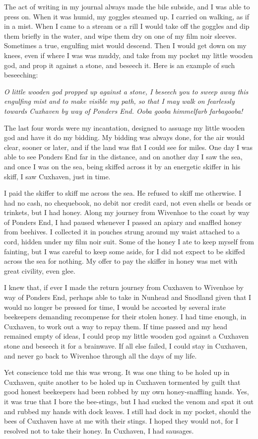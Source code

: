The act of writing in my journal always made the bile subside, and I was able to press on. When it was humid, my goggles steamed up. I carried on walking, as if in a mist. When I came to a stream or a rill I would take off the goggles and dip them briefly in the water, and wipe them dry on one of my film noir sleeves. Sometimes a true, engulfing mist would descend. Then I would get down on my knees, even if where I was was muddy, and take from my pocket my little wooden god, and prop it against a stone, and beseech it. Here is an example of such beseeching:

\emph{O little wooden god propped up against a stone, I beseech you to sweep away this engulfing mist and to make visible my path, so that I may walk on fearlessly towards Cuxhaven by way of Ponders End. Ooba gooba himmelfarb farbagooba!}

The last four words were my incantation, designed to assuage my little wooden god and have it do my bidding. My bidding was always done, for the air would clear, sooner or later, and if the land was flat I could see for miles. One day I was able to see Ponders End far in the distance, and on another day I saw the sea, and once I was on the sea, being skiffed across it by an energetic skiffer in his skiff, I saw Cuxhaven, just in time.

I paid the skiffer to skiff me across the sea. He refused to skiff me otherwise. I had no cash, no chequebook, no debit nor credit card, not even shells or beads or trinkets, but I had honey. Along my journey from Wivenhoe to the coast by way of Ponders End, I had paused whenever I passed an apiary and snaffled honey from beehives. I collected it in pouches strung around my waist attached to a cord, hidden under my film noir suit. Some of the honey I ate to keep myself from fainting, but I was careful to keep some aside, for I did not expect to be skiffed across the sea for nothing. My offer to pay the skiffer in honey was met with great civility, even glee.

I knew that, if ever I made the return journey from Cuxhaven to Wivenhoe by way of Ponders End, perhaps able to take in Nunhead and Snodland given that I would no longer be pressed for time, I would be accosted by several irate beekeepers demanding recompense for their stolen honey. I had time enough, in Cuxhaven, to work out a way to repay them. If time passed and my head remained empty of ideas, I could prop my little wooden god against a Cuxhaven stone and beseech it for a brainwave. If all else failed, I could stay in Cuxhaven, and never go back to Wivenhoe through all the days of my life.

Yet conscience told me this was wrong. It was one thing to be holed up in Cuxhaven, quite another to be holed up in Cuxhaven tormented by guilt that good honest beekeepers had been robbed by my own honey-snaffling hands. Yes, it was true that I bore the bee-stings, but I had sucked the venom and spat it out and rubbed my hands with dock leaves. I still had dock in my pocket, should the bees of Cuxhaven have at me with their stings. I hoped they would not, for I resolved not to take their honey. In Cuxhaven, I had sausages.
